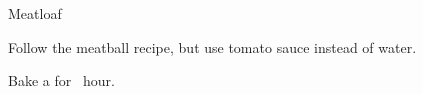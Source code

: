 \begin{recipe}{Meatloaf}{}{}

\begin{directions}
\item Follow the meatball recipe, but use tomato sauce instead of water.
\item Bake a  for \half~hour.
\end{directions}
\end{recipe}
